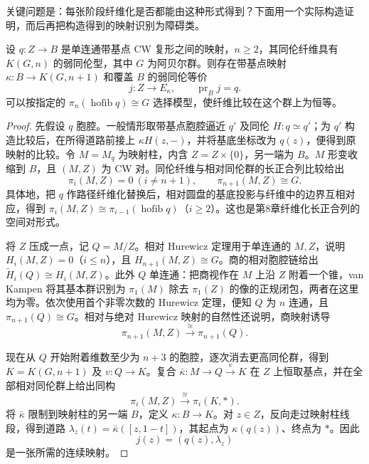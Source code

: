 \ProseParagraphBreak

关键问题是：每张阶段纤维化是否都能由这种形式得到？下面用一个实际构造证明，而后再把构造得到的映射识别为障碍类。

\begin{lemma}\label{g2:lem:principal-em-fibration}
	设 \(q:Z\to B\) 是单连通带基点 CW 复形之间的映射，\(n\ge2\)，其同伦纤维具有 \(K(G,n)\) 的弱同伦型，其中 \(G\) 为阿贝尔群。则存在带基点映射 \(\kappa:B\to K(G,n+1)\) 和覆盖 \(B\) 的弱同伦等价
	\[
		j:Z\longrightarrow E_\kappa,\qquad \operatorname{pr}_B j=q.
	\]
	可以按指定的 \(\pi_n(\operatorname{hofib}q)\cong G\) 选择模型，使纤维比较在这个群上为恒等。
\end{lemma}
\begin{proof}
	先假设 \(q\) 胞腔。一般情形取带基点胞腔逼近 \(q'\) 及同伦 \(H:q\simeq q'\)；为 \(q'\) 构造比较后，在所得道路前接上 \(\kappa H(z,-)\)，并将基底坐标改为 \(q(z)\)，便得到原映射的比较。令 \(M=M_q\) 为映射柱，内含 \(Z=Z\times\{0\}\)，另一端为 \(B\)。\(M\) 形变收缩到 \(B\)，且 \((M,Z)\) 为 CW 对。同伦纤维与相对同伦群的长正合列比较给出
	\[
		\pi_i(M,Z)=0\ (i\ne n+1),\qquad \pi_{n+1}(M,Z)\cong G.
	\]
	具体地，把 \(q\) 作路径纤维化替换后，相对圆盘的基底投影与纤维中的边界互相对应，得到 \(\pi_i(M,Z)\cong\pi_{i-1}(\operatorname{hofib}q)\)（\(i\ge2\)）。这也是第8章纤维化长正合列的空间对形式。

	将 \(Z\) 压成一点，记 \(Q=M/Z\)。相对 Hurewicz 定理用于单连通的 \(M,Z\)，说明 \(H_i(M,Z)=0\)（\(i\le n\)），且 \(H_{n+1}(M,Z)\cong G\)。商的相对胞腔链给出 \(\widetilde H_i(Q)\cong H_i(M,Z)\)。此外 \(Q\) 单连通：把商视作在 \(M\) 上沿 \(Z\) 附着一个锥，van Kampen 将其基本群识别为 \(\pi_1(M)\) 除去 \(\pi_1(Z)\) 的像的正规闭包，两者在这里均为零。依次使用首个非零次数的 Hurewicz 定理，便知 \(Q\) 为 \(n\) 连通，且 \(\pi_{n+1}(Q)\cong G\)。相对与绝对 Hurewicz 映射的自然性还说明，商映射诱导
	\[
		\pi_{n+1}(M,Z)\xrightarrow{\cong}\pi_{n+1}(Q).
	\]

	现在从 \(Q\) 开始附着维数至少为 \(n+3\) 的胞腔，逐次消去更高同伦群，得到 \(K=K(G,n+1)\) 及 \(v:Q\to K\)。复合 \(\bar\kappa:M\to Q\xrightarrow{v}K\) 在 \(Z\) 上恒取基点，并在全部相对同伦群上给出同构
	\[
		\pi_i(M,Z)\xrightarrow{\cong}\pi_i(K,*).
	\]
	将 \(\bar\kappa\) 限制到映射柱的另一端 \(B\)，定义 \(\kappa:B\to K\)。对 \(z\in Z\)，反向走过映射柱线段，得到道路 \(\lambda_z(t)=\bar\kappa([z,1-t])\)，其起点为 \(\kappa(q(z))\)、终点为 \(*\)。因此
	\[
		j(z)=(q(z),\lambda_z)
	\]
	是一张所需的连续映射。


\end{proof}
